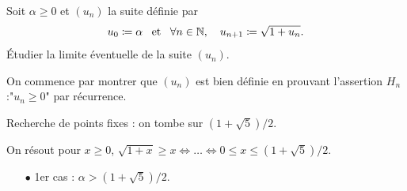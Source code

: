 \documentclass{magnoliaold}
\begin{document}
\begin{exos}
\exo Soit $\alpha\geq 0$ et $(u_n)$ la suite définie par
  \[u_0\coloneqq\alpha \quad\!\text{et}\quad\! \forall n\in\mathbb{N} ,\quad u_{n+1}\coloneqq\sqrt{1+u_n}.\]
  Étudier la limite éventuelle de la suite $(u_n)$.
\begin{center}
\end{center}
\begin{sol}
On commence par montrer que $(u_n)$ est bien définie en prouvant l'assertion $H_n$:"$u_n\geq 0$" par récurrence.

Recherche de points fixes : on tombe sur $(1+\sqrt{5})/2$.

On résout pour $x\geq 0$, $\sqrt{1+x}\geq x \Longleftrightarrow \ldots \Longleftrightarrow 0\leq x \leq (1+\sqrt{5})/2$.

\begin{itemize}
\item[$\bullet$] 1er cas : $\alpha> (1+\sqrt{5})/2$.


\end{itemize}
\end{sol}
\end{exos}
\end{document}
